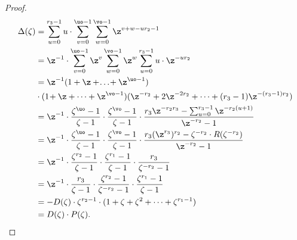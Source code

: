 \begin{proof}
\begin{equation*}\label{Delta}
\begin{split}
\Delta(\zeta)&=
\sum_{u=0}^{r_3-1}u\cdot\sum_{v=0}^{\uo-1} \sum _{w=0}^{\vo-1} \z^{v+w-ur_2-1}\\
&=\z^{-1}\cdot\sum_{v=0}^{\uo-1}\z^v \sum _{w=0}^{\vo-1} \z^{w}\sum_{u=0}^{r_3-1}u\cdot\z^{-ur_2}\\
&=\z^{-1}(1+\z+\!\dots\!+\z^{\uo-1})\\
&\cdot(1\!+\z+\dots+\z^{\vo-1})(\z^{-r_2}+2\z^{-2r_2}+\dots+(r_3-1)\z^{-(r_3-1)r_2})\\
&=\z^{-1} \cdot \frac{\zeta^{\uo}-1}{\zeta-1}\cdot \frac{\zeta^{\vo}-1}{\zeta-1}\cdot \frac{r_3\z^{-r_2r_3}-\sum_{u=0}^{r_3-1}\z^{-r_2(u+1)}}{\z^{-r_2}-1}
\\
&=\z^{-1} \cdot \frac{\zeta^{\uo}-1}{\zeta-1}\cdot \frac{\zeta^{\vo}-1}{\zeta-1}\cdot \frac{r_3(\z^{r_3})^{r_2}-\zeta^{-r_2}\cdot R(\zeta^{-r_2})}{\z^{-r_2}-1}
\\
&=\z^{-1}\cdot\frac{\zeta^{r_2}-1}{\zeta-1}\cdot \frac{\zeta^{r_1}-1}{\zeta-1} \cdot \frac{r_3}{\zeta^{-r_2}-1}\\
&=\z^{-1}\cdot\frac{r_3}{\zeta-1}\cdot \frac{\zeta^{r_2}-1}{\zeta^{-r_2}-1}\cdot \frac{\zeta^{r_1}-1}{\zeta-1}\\
&=-D(\zeta)\cdot \zeta^{r_2-1}\cdot (1+\zeta+\zeta^2+\dots+\zeta^{r_1-1})\\
&=D(\zeta)\cdot P(\zeta).
\end{split}
\end{equation*}
\end{proof}


